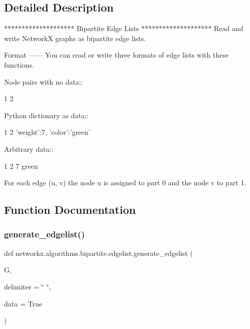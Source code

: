 \subsection{Detailed Description}
\begin{DoxyVerb}********************
Bipartite Edge Lists
********************
Read and write NetworkX graphs as bipartite edge lists.

Format
------
You can read or write three formats of edge lists with these functions.

Node pairs with no data::

 1 2

Python dictionary as data::

 1 2 {'weight':7, 'color':'green'}

Arbitrary data::

 1 2 7 green

For each edge (u, v) the node u is assigned to part 0 and the node v to part 1.
\end{DoxyVerb}
 

\subsection{Function Documentation}
\mbox{\label{namespacenetworkx_1_1algorithms_1_1bipartite_1_1edgelist_a266599de891eacaa2b95b9c8af109b0a}} 
\subsubsection{\texorpdfstring{generate\+\_\+edgelist()}{generate\_edgelist()}}
{\footnotesize\ttfamily def networkx.\+algorithms.\+bipartite.\+edgelist.\+generate\+\_\+edgelist (\begin{DoxyParamCaption}\item[{}]{G,  }\item[{}]{delimiter = {\ttfamily \char`\"{}~\char`\"{}},  }\item[{}]{data = {\ttfamily True} }\end{DoxyParamCaption})}

